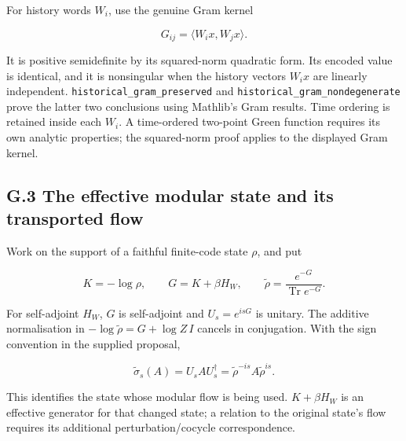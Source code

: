 \documentclass[
]{article}
\begin{document}
For history words \(W_i\), use the genuine Gram kernel

\[
G_{ij}=\langle W_i x,W_j x\rangle.
\]

It is positive semidefinite by its squared-norm quadratic form. Its
encoded value is identical, and it is nonsingular when the history
vectors \(W_i x\) are linearly independent.
\texttt{h\allowbreak{}i\allowbreak{}s\allowbreak{}t\allowbreak{}o\allowbreak{}r\allowbreak{}i\allowbreak{}c\allowbreak{}a\allowbreak{}l\allowbreak{}\_\allowbreak{}g\allowbreak{}r\allowbreak{}a\allowbreak{}m\allowbreak{}\_\allowbreak{}p\allowbreak{}r\allowbreak{}e\allowbreak{}s\allowbreak{}e\allowbreak{}r\allowbreak{}v\allowbreak{}e\allowbreak{}d}
and
\texttt{h\allowbreak{}i\allowbreak{}s\allowbreak{}t\allowbreak{}o\allowbreak{}r\allowbreak{}i\allowbreak{}c\allowbreak{}a\allowbreak{}l\allowbreak{}\_\allowbreak{}g\allowbreak{}r\allowbreak{}a\allowbreak{}m\allowbreak{}\_\allowbreak{}n\allowbreak{}o\allowbreak{}n\allowbreak{}d\allowbreak{}e\allowbreak{}g\allowbreak{}e\allowbreak{}n\allowbreak{}e\allowbreak{}r\allowbreak{}a\allowbreak{}t\allowbreak{}e}
prove the latter two conclusions using Mathlib's Gram results. Time
ordering is retained inside each \(W_i\). A time-ordered two-point Green
function requires its own analytic properties; the squared-norm proof
applies to the displayed Gram kernel.

\subsection{G.3 The effective modular state and its transported
flow}\label{g.3-the-effective-modular-state-and-its-transported-flow}

Work on the support of a faithful finite-code state \(\rho\), and put

\[
K=-\log\rho,\qquad G=K+\beta H_W,\qquad
\widetilde\rho=\frac{e^{-G}}{\operatorname{Tr}e^{-G}}.
\]

For self-adjoint \(H_W\), \(G\) is self-adjoint and \(U_s=e^{isG}\) is
unitary. The additive normalisation in
\(-\log\widetilde\rho=G+\log Z\,I\) cancels in conjugation. With the
sign convention in the supplied proposal,

\[
\widetilde\sigma_s(A)=U_sAU_s^\dagger
=\widetilde\rho^{-is}A\widetilde\rho^{is}.
\]

This identifies the state whose modular flow is being used.
\(K+\beta H_W\) is an effective generator for that changed state; a
relation to the original state's flow requires its additional
p\allowbreak{}e\allowbreak{}r\allowbreak{}t\allowbreak{}u\allowbreak{}r\allowbreak{}b\allowbreak{}a\allowbreak{}t\allowbreak{}i\allowbreak{}o\allowbreak{}n\allowbreak{}/\allowbreak{}c\allowbreak{}o\allowbreak{}c\allowbreak{}y\allowbreak{}c\allowbreak{}l\allowbreak{}e
correspondence.
\end{document}
